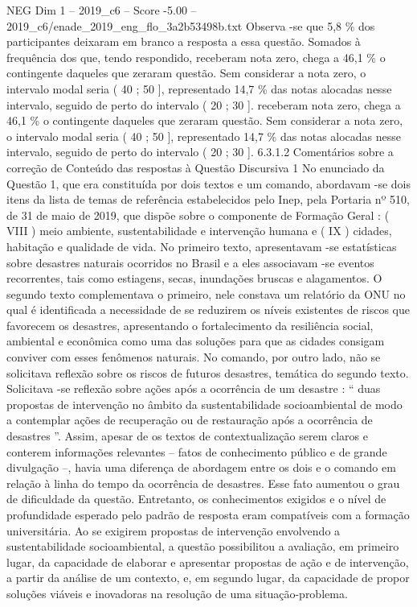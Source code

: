 \begin{textsample}{NEG Dim 1 – 2019\_c6 – Score -5.00 – 2019\_c6/enade\_2019\_eng\_flo\_3a2b53498b.txt}
Observa -se que 5,8 \% dos participantes deixaram em branco a resposta a essa questão.
Somados à frequência dos que, tendo respondido, receberam nota zero, chega a 46,1 \% o contingente daqueles que zeraram questão.
Sem considerar a nota zero, o intervalo modal seria ( 40 ; 50 ], representado 14,7 \% das notas alocadas nesse intervalo, seguido de perto do intervalo ( 20 ; 30 ]. receberam nota zero, chega a 46,1 \% o contingente daqueles que zeraram questão.
Sem considerar a nota zero, o intervalo modal seria ( 40 ; 50 ], representado 14,7 \% das notas alocadas nesse intervalo, seguido de perto do intervalo ( 20 ; 30 ]. 6.3.1.2 Comentários sobre a correção de Conteúdo das respostas à Questão Discursiva 1 No enunciado da Questão 1, que era constituída por dois textos e um comando, abordavam -se dois itens da lista de temas de referência estabelecidos pelo Inep, pela Portaria nº 510, de 31 de maio de 2019, que dispõe sobre o componente de Formação Geral : ( VIII ) meio ambiente, sustentabilidade e intervenção humana e ( IX ) cidades, habitação e qualidade de vida.
No primeiro texto, apresentavam -se estatísticas sobre desastres naturais ocorridos no Brasil e a eles associavam -se eventos recorrentes, tais como estiagens, secas, inundações bruscas e alagamentos.
O segundo texto complementava o primeiro, nele constava um relatório da ONU no qual é identificada a necessidade de se reduzirem os níveis existentes de riscos que favorecem os desastres, apresentando o fortalecimento da resiliência social, ambiental e econômica como uma das soluções para que as cidades consigam conviver com esses fenômenos naturais.
No comando, por outro lado, não se solicitava reflexão sobre os riscos de futuros desastres, temática do segundo texto.
Solicitava -se reflexão sobre ações após a ocorrência de um desastre : “ duas propostas de intervenção no âmbito da sustentabilidade socioambiental de modo a contemplar ações de recuperação ou de restauração após a ocorrência de desastres ”.
Assim, apesar de os textos de contextualização serem claros e conterem informações relevantes – fatos de conhecimento público e de grande divulgação –, havia uma diferença de abordagem entre os dois e o comando em relação à linha do tempo da ocorrência de desastres.
Esse fato aumentou o grau de dificuldade da questão.
Entretanto, os conhecimentos exigidos e o nível de profundidade esperado pelo padrão de resposta eram compatíveis com a formação universitária.
Ao se exigirem propostas de intervenção envolvendo a sustentabilidade socioambiental, a questão possibilitou a avaliação, em primeiro lugar, da capacidade de elaborar e apresentar propostas de ação e de intervenção, a partir da análise de um contexto, e, em segundo lugar, da capacidade de propor soluções viáveis e inovadoras na resolução de uma situação-problema.

\end{textsample}
